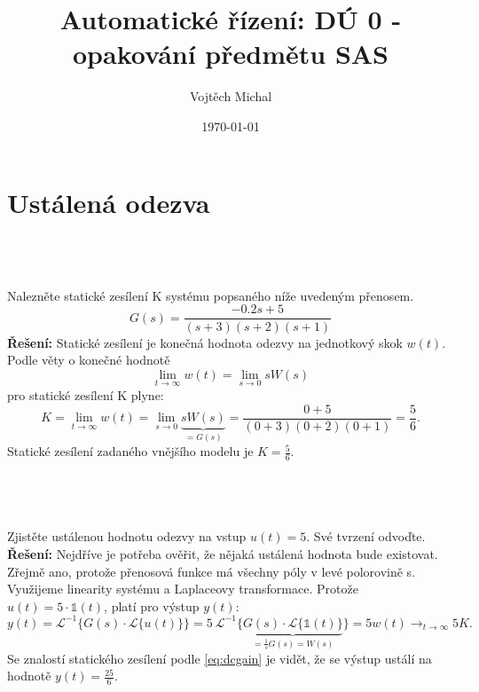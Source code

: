 \documentclass[twoside]{article}
\title{Automatické řízení: DÚ 0 - opakování předmětu SAS}
\author{Vojtěch Michal}
\date{\today}
\begin{document}
\maketitle

\section{Ustálená odezva}
\label{sec:ukol1}

\subsection{~}
\label{sec:ukol1:1}
Nalezněte statické zesílení K systému popsaného níže uvedeným přenosem.
\begin{equation}
	G(s) = \frac{-0.2s+5}{(s+3)(s+2)(s+1)}
\end{equation}
\textbf{Řešení:} Statické zesílení je konečná hodnota odezvy na jednotkový skok $w(t)$. Podle věty o konečné hodnotě
\begin{equation}
	\lim_{t \to \infty}w(t) = \lim_{s \to 0}sW(s)
\end{equation}
pro statické zesílení K plyne:
\begin{equation}
	\label{eq:dcgain}
	K = \lim_{t \to \infty}w(t) = \lim_{s \to 0}{\underbrace{sW(s)}_{=G(s)}} = \frac{0+5}{(0+3)(0+2)(0+1)} = \frac{5}{6}.
\end{equation}
Statické zesílení zadaného vnějšího modelu je $K = \frac{5}{6}$.

\subsection{~}
Zjistěte ustálenou hodnotu odezvy na vstup $u (t) = 5$. Své tvrzení odvoďte. \\
\textbf{Řešení:} Nejdříve je potřeba ověřit, že nějaká ustálená hodnota bude existovat. Zřejmě ano, protože přenosová funkce má všechny póly
v levé polorovině s. Využijeme linearity systému a Laplaceovy transformace. Protože $u(t) = 5\cdot \mathbb{1}(t)$, platí pro výstup $y(t)$:
\begin{equation}
	y(t) = \mathcal{L}^{-1}\{G(s) \cdot \mathcal{L}\{u(t)\}\} = 5~\mathcal{L}^{-1}\{\underbrace{G(s) \cdot \mathcal{L}\{\mathbb{1}(t)\}}_{= \frac{1}{s}G(s)=W(s)}\}
	= 5 w(t) \longrightarrow_{t \to \infty} 5 K.
\end{equation}
Se znalostí statického zesílení podle \eqref{eq:dcgain} je vidět, že se výstup ustálí na hodnotě $y(t)=\frac{25}{6}$.
\end{document}
